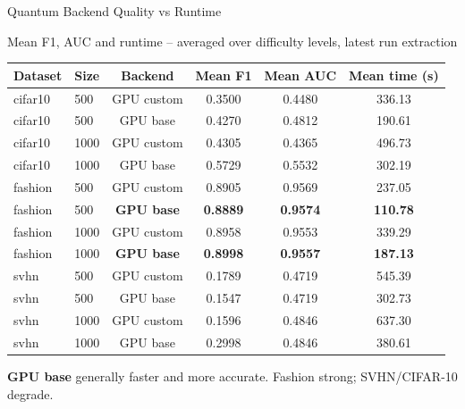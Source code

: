 \documentclass[10pt, aspectratio=169]{beamer}
\begin{document}
\begin{frame}{Quantum Backend Quality vs Runtime}
    \begin{center}
    {\scriptsize Mean F1, AUC and runtime -- averaged over difficulty levels, latest run extraction}
    \end{center}
    \vspace{-0.15cm}
    \begin{center}
    \scriptsize
    \begin{tabular}{llcccc}
        \toprule
        \textbf{Dataset} & \textbf{Size} & \textbf{Backend} & \textbf{Mean F1} & \textbf{Mean AUC} & \textbf{Mean time (s)} \\
        \midrule
        cifar10 & 500  & GPU custom & 0.3500 & 0.4480 & 336.13 \\
        cifar10 & 500  & GPU base   & 0.4270 & 0.4812 & 190.61 \\
        cifar10 & 1000 & GPU custom & 0.4305 & 0.4365 & 496.73 \\
        cifar10 & 1000 & GPU base   & 0.5729 & 0.5532 & 302.19 \\
        fashion & 500  & GPU custom & 0.8905 & 0.9569 & 237.05 \\
        fashion & 500  & \textbf{GPU base}   & \textbf{0.8889} & \textbf{0.9574} & \textbf{110.78} \\
        fashion & 1000 & GPU custom & 0.8958 & 0.9553 & 339.29 \\
        fashion & 1000 & \textbf{GPU base}   & \textbf{0.8998} & \textbf{0.9557} & \textbf{187.13} \\
        svhn    & 500  & GPU custom & 0.1789 & 0.4719 & 545.39 \\
        svhn    & 500  & GPU base   & 0.1547 & 0.4719 & 302.73 \\
        svhn    & 1000 & GPU custom & 0.1596 & 0.4846 & 637.30 \\
        svhn    & 1000 & GPU base   & 0.2998 & 0.4846 & 380.61 \\
        \bottomrule
    \end{tabular}
    \end{center}
    {\small \textbf{GPU base} generally faster and more accurate. Fashion strong; SVHN/CIFAR-10 degrade.}
\end{frame}
\end{document}
